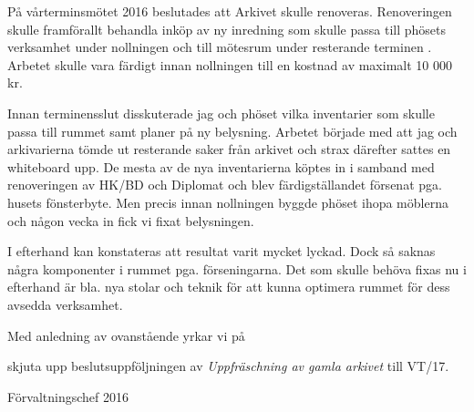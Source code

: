\documentclass[../_main/handlingar.tex]{subfiles}
\begin{document}

På vårterminsmötet 2016 beslutades att Arkivet skulle renoveras. Renoveringen skulle framförallt behandla inköp av ny inredning som skulle passa till phösets verksamhet under nollningen och till mötesrum under resterande terminen . Arbetet skulle vara färdigt innan nollningen till en kostnad av maximalt 10 000 kr.

Innan terminensslut disskuterade jag och phöset vilka inventarier som skulle passa till rummet samt planer på ny belysning. Arbetet började med att jag och arkivarierna tömde ut resterande saker från arkivet och strax därefter sattes en whiteboard upp. De mesta av de nya inventarierna köptes in i samband med renoveringen av HK/BD och Diplomat och blev färdigställandet försenat pga. husets fönsterbyte. Men precis innan nollningen byggde phöset ihopa möblerna och någon vecka in fick vi fixat belysningen.

I efterhand kan konstateras att resultat varit mycket lyckad. Dock så saknas några komponenter i rummet pga. förseningarna. Det som skulle behöva fixas nu i efterhand är bla. nya stolar och teknik för att kunna optimera rummet för dess avsedda verksamhet.

Med anledning av ovanstående yrkar vi på

\begin{attsatser}
    \att skjuta upp beslutsuppföljningen av \emph{Uppfräschning av gamla arkivet} till VT/17.
\end{attsatser}

\begin{signatures}{1}
    \ist
    \signature{Anders Nilsson}{Förvaltningschef 2016}
\end{signatures}
\end{document}
